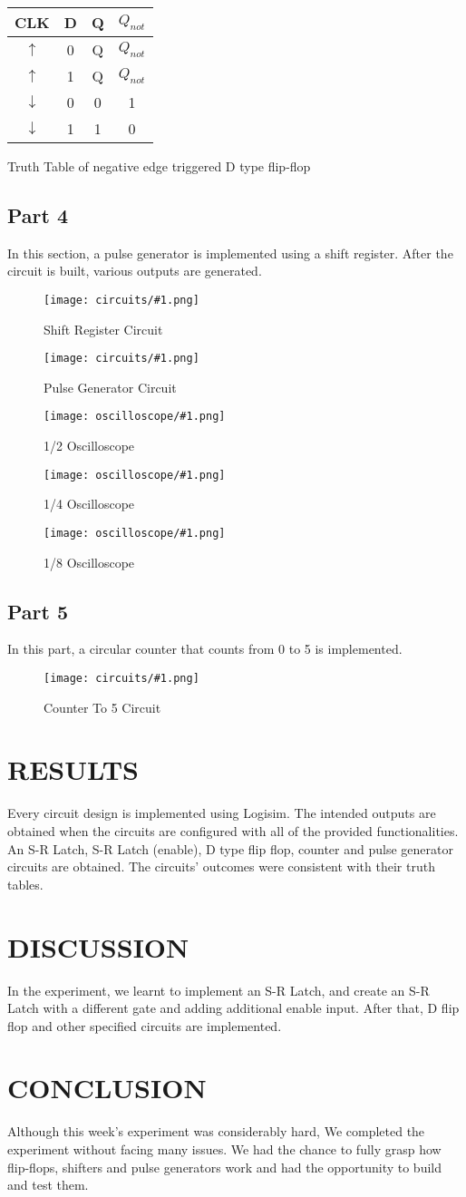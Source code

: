 \documentclass[pdftex,12pt,a4paper]{article}
\theoremstyle{plain}
\newcommand{\circuit}[1]{
    \begin{figure}[H]
    	\centering
    	\texttt{[image: circuits/\#1.png]}
    	\caption{#1 Circuit}
    	\label{fig7}
    \end{figure}
    \vspace{1cm}
}
\newcommand{\oscilloscope}[1]{
    \begin{figure}[H]
    	\centering
    	\texttt{[image: oscilloscope/\#1.png]}
    	\caption{1/#1 Oscilloscope}
    	\label{fig7}
    \end{figure}
    \vspace{1cm}
}
\begin{document}
        \begin{center}
            \begin{tabular}{c c | c c}
                CLK & D & Q & $Q_{not}$ \\
                \hline 
                $\uparrow$ & 0 & Q & $Q_{not}$ \\
                $\uparrow$ & 1 & Q & $Q_{not}$ \\
                $\downarrow$ & 0 & 0 & 1 \\
                $\downarrow$ & 1 & 1 & 0 \\
            \end{tabular}
        \end{center}
        {\centering Truth Table of negative edge triggered D type flip-flop\\}
        
    \subsection{Part 4}
        In this section, a pulse generator is implemented using a shift register. After the circuit is built, various outputs are generated.
        \circuit{Shift Register}
        \circuit{Pulse Generator}
        \oscilloscope{2}
        \oscilloscope{4}
        \oscilloscope{8}

    \newpage
    \subsection{Part 5}
        In this part, a circular counter that counts from 0 to 5 is implemented.
        \circuit{Counter To 5}
\section{RESULTS}
Every circuit design is implemented using Logisim. The intended outputs are obtained when the circuits are configured with all of the provided functionalities. An S-R Latch, S-R Latch (enable), D type flip flop, counter and pulse generator circuits are obtained. The circuits' outcomes were consistent with their truth tables.

\section{DISCUSSION}
In the experiment, we learnt to implement an S-R Latch, and create an S-R Latch with a different gate and adding additional enable input. After that, D flip flop and other specified circuits are implemented.
\section{CONCLUSION}
Although this week's experiment was considerably hard, We completed the experiment without facing many issues. We had the chance to fully grasp how flip-flops, shifters and pulse generators work and had the opportunity to build and test them.
\end{document}
